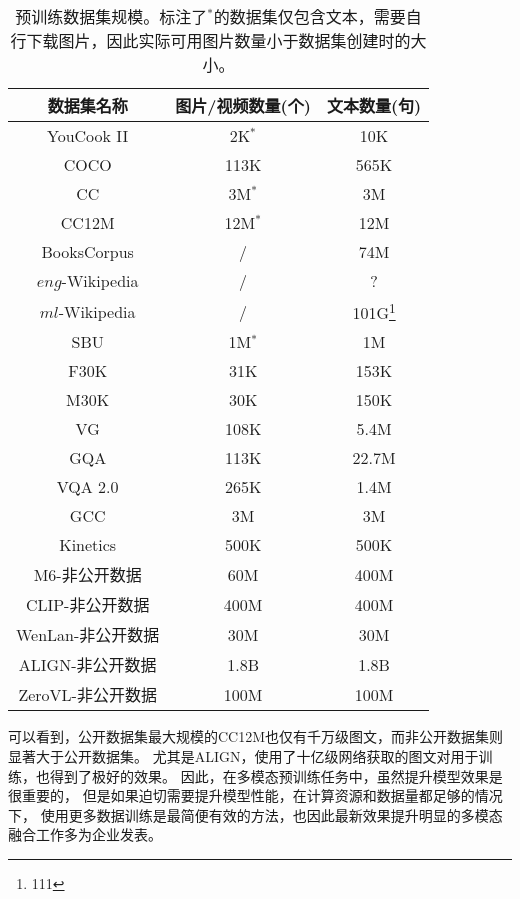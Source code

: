 \begin{table}[]
\centering
\begin{tabular}{c|cc}
数据集名称 & 图片/视频数量(个) & 文本数量(句) \\ \hline
YouCook II & 2K$^*$ & 10K \\
COCO & 113K & 565K \\
CC & 3M$^*$ & 3M \\
CC12M & 12M$^*$ & 12M \\
BooksCorpus & / & 74M \\
$eng$-Wikipedia & / & ? \\
$ml$-Wikipedia & / & 101G\footnote{111} \\
SBU & 1M$^*$ & 1M \\
F30K & 31K & 153K \\
M30K & 30K & 150K \\
VG & 108K & 5.4M \\
GQA & 113K & 22.7M \\
VQA 2.0 & 265K & 1.4M \\
GCC & 3M & 3M \\
Kinetics & 500K & 500K \\
M6-非公开数据 & 60M & 400M \\
CLIP-非公开数据 & 400M & 400M \\
WenLan-非公开数据 & 30M & 30M \\
ALIGN-非公开数据 & 1.8B & 1.8B \\
ZeroVL-非公开数据 & 100M & 100M
\end{tabular}
\caption{预训练数据集规模。标注了$^*$的数据集仅包含文本，需要自行下载图片，因此实际可用图片数量小于数据集创建时的大小。}
\label{tab:dataset}
\end{table}

可以看到，公开数据集最大规模的CC12M也仅有千万级图文，而非公开数据集则显著大于公开数据集。
尤其是ALIGN，使用了十亿级网络获取的图文对用于训练，也得到了极好的效果。
因此，在多模态预训练任务中，虽然提升模型效果是很重要的，
但是如果迫切需要提升模型性能，在计算资源和数据量都足够的情况下，
使用更多数据训练是最简便有效的方法，也因此最新效果提升明显的多模态融合工作多为企业发表。